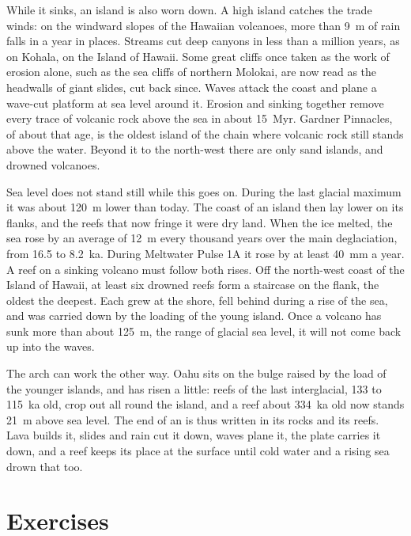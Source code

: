 While it sinks, an island is also worn down. A high island catches the trade winds: on the
windward slopes of the Hawaiian volcanoes, more than \qty{9}{m} of rain falls in a year in places.
Streams cut deep canyons in less than a million years, as on Kohala, on the Island of Hawaii.
Some great cliffs once taken as the work of erosion alone, such as the sea cliffs of northern
Molokai, are now read as the headwalls of giant slides, cut back since. Waves attack the coast and
plane a wave-cut platform at sea level around it. Erosion and sinking together remove every trace
of volcanic rock above the sea in about \qty{15}{Myr}. Gardner Pinnacles, of about that age, is
the oldest island of the chain where volcanic rock still stands above the water. Beyond it to the
north-west there are only sand islands,  and drowned volcanoes.

Sea level does not stand still while this goes on. During the last glacial maximum it was about
\qty{120}{m} lower than today. The coast of an island then lay lower on its flanks, and the reefs
that now fringe it were dry land. When the ice melted, the sea rose by an average of \qty{12}{m}
every thousand years over the main deglaciation, from 16.5 to \qty{8.2}{ka}. During Meltwater
Pulse 1A it rose by at least \qty{40}{mm} a year. A reef on a sinking volcano must follow both
rises. Off the north-west coast of the Island of Hawaii, at least six drowned reefs form a
staircase on the flank, the oldest the deepest. Each grew at the shore, fell behind during a rise
of the sea, and was carried down by the loading of the young island. Once a volcano has sunk more
than about \qty{125}{m}, the range of glacial sea level, it will not come back up into the waves.

The arch can work the other way. Oahu sits on the bulge raised by the load of the younger islands,
and has risen a little: reefs of the last interglacial, 133 to \qty{115}{ka} old, crop out all
round the island, and a reef about \qty{334}{ka} old now stands \qty{21}{m} above sea level. The
end of an  is thus written in its rocks and its reefs. Lava builds it, slides and
rain cut it down, waves plane it, the plate carries it down, and a reef keeps its place at the
surface until cold water and a rising sea drown that too.

\section*{Exercises}\label{sec:b2:oceanic-islands:exercises}

